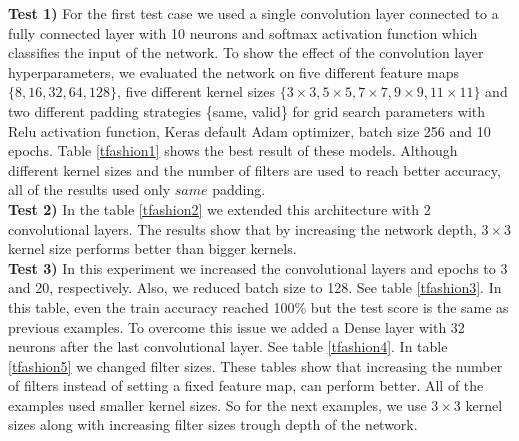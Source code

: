 \documentclass[10pt]{SelfArx} %
\begin{document}
	\textbf{Test 1)}  For the first test case we used a single convolution layer connected to a fully connected layer with 10 neurons and softmax activation function which classifies the input of the network. To show the effect of the convolution layer hyperparameters, we evaluated the network on five different feature maps $\{8,16,32,64,128\}$, five different kernel sizes $\{3\times3, 5\times5, 7\times7,9\times9,11\times11\}$ and two different padding strategies \{same, valid\} for grid search parameters with Relu activation function, Keras default Adam optimizer, batch size 256 and 10 epochs. Table \ref{tfashion1} shows the best result of these models. Although different kernel sizes and the number of filters are used to reach better accuracy, all of the results used only $same$ padding. 
	\\
	\textbf{Test 2)} In the table \ref{tfashion2} we extended this architecture with 2 convolutional layers. The results show that by increasing the network depth, $3\times3$ kernel size performs better than bigger kernels.
	\\
	\textbf{Test 3)} In this experiment we increased the convolutional layers and epochs to 3 and 20, respectively. Also, we reduced batch size to 128. See table \ref{tfashion3}. In this table, even the train accuracy reached 100\% but the test score is the same as previous examples. To overcome this issue we added a Dense layer with 32 neurons after the last convolutional layer. See table  \ref{tfashion4}. In table \ref{tfashion5} we changed filter sizes. These tables show that increasing the number of filters instead of setting a fixed feature map, can perform better. All of the examples used smaller kernel sizes. So for the next examples, we use $3\times3$ kernel sizes along with increasing filter sizes trough depth of the network.
	
\end{document}
